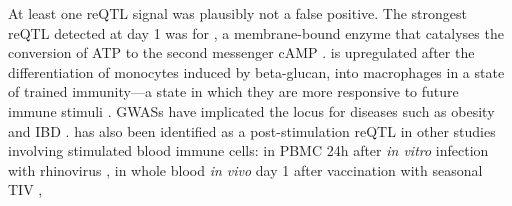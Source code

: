 At least one \gls{reQTL} signal was plausibly not a false positive.
The strongest \gls{reQTL} detected at day 1 was for , a membrane-bound enzyme that catalyses the conversion of ATP to the second messenger cAMP \autocite{wu2016AdenylateCyclaseNew}.
 is upregulated after the differentiation of monocytes induced by beta-glucan,
into macrophages in a state of trained immunity---a state in which they are more responsive to future immune stimuli \autocite{saeed2014EpigeneticProgrammingMonocytetomacrophage}.
\Glspl{GWAS} have implicated the  locus for diseases such as obesity \autocite{wu2016AdenylateCyclaseNew} and \gls{IBD} \autocite{delange2017GenomewideAssociationStudy}.
 has also been identified as a post-stimulation \gls{reQTL} in other studies involving stimulated blood immune cells:
in \gls{PBMC} 24h after \textit{in vitro} infection with rhinovirus \autocite{caliskan2015HostGeneticVariation},
in whole blood \textit{in vivo} day 1 after vaccination with seasonal \gls{TIV} \autocite{franco2013IntegrativeGenomicAnalysis},
